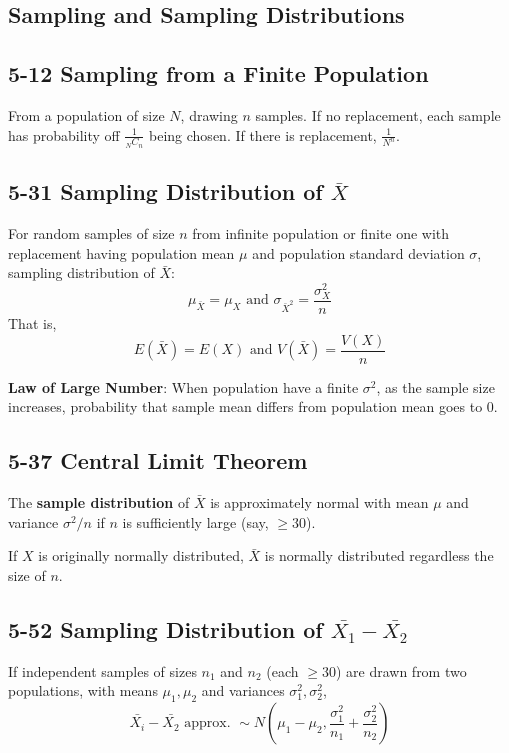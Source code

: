 \documentclass[12pt,landscape]{article}
\begin{document}
\begin{multicols}{3}
    
    \section{Sampling and Sampling Distributions}

    \subsection{5-12 Sampling from a Finite Population}
    From a population of size $N$, drawing $n$ samples. If no replacement, each sample has probability off
    $\frac{1}{_NC_n}$ being chosen. If there is replacement, $\frac{1}{N^n}$.

    \subsection{5-31 Sampling Distribution of $\bar{X}$}
    For random samples of size $n$ from infinite population or finite one with replacement having population
    mean $\mu$ and population standard deviation $\sigma$, sampling distribution of $\bar{X}$:
        $$ \mu_{\bar{X}} = \mu_X \text{ and } \sigma_{\bar{X}^2} = \frac{\sigma_X^2}{n} $$
    That is,
        $$ E(\bar{X}) = E(X) \text{ and } V(\bar{X}) = \frac{V(X)}{n} $$
    
    \textbf{Law of Large Number}:
    When population have a finite $\sigma^2$, as the sample size increases, probability that sample mean differs
    from population mean goes to 0.

    \subsection{5-37 Central Limit Theorem}
    The \textbf{sample distribution} of $\bar{X}$ is approximately normal with mean $\mu$ and variance $\sigma^2/n$
    if $n$ is sufficiently large (say, $\geq 30$).

    If $X$ is originally normally distributed, $\bar{X}$ is normally distributed regardless the size of $n$.

    \subsection{5-52 Sampling Distribution of $\bar{X_1} - \bar{X_2}$}
    If independent samples of sizes $n_1$ and $n_2$ (each $\geq 30$) are drawn from two populations, with means
    $\mu_1, \mu_2$ and variances $\sigma^2_1, \sigma^2_2$,
        $$ \bar{X_i} - \bar{X_2} \text{ approx. } \sim N(\mu_1 - \mu_2, \frac{\sigma_1^2}{n_1} + \frac{\sigma_2^2}{n_2}) $$
    

\end{multicols}
\end{document}
